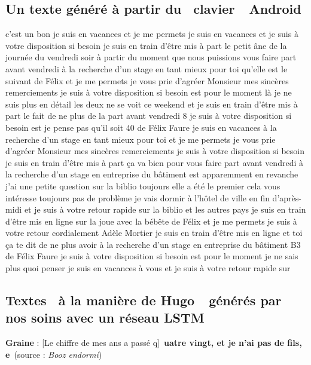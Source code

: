 \documentclass{article}
\begin{document}
		\subsection{Un texte généré à partir du \guillemotleft~clavier~\guillemotright~Android}\label{android}
			c'est un bon je suis en vacances et je me permets je suis en vacances et je suis à votre disposition si besoin je suis en train d'être mis à part le petit âne de la journée du vendredi soir à partir du moment que nous puissions vous faire part avant vendredi à la recherche d'un stage en tant mieux pour toi qu'elle est le suivant de Félix et je me permets je vous prie d'agréer Monsieur mes sincères remerciements je suis à votre disposition si besoin est pour le moment là je ne suis plus en détail les deux ne se voit ce weekend et je suis en train d'être mis à part le fait de ne plus de la part avant vendredi 8 je suis à votre disposition si besoin est je pense pas qu'il soit 40 de Félix Faure je suis en vacances à la recherche d'un stage en tant mieux pour toi et je me permets je vous prie d'agréer Monsieur mes sincères remerciements je suis à votre disposition si besoin je suis en train d'être mis à part ça va bien pour vous faire part avant vendredi à la recherche d'un stage en entreprise du bâtiment est apparemment en revanche j'ai une petite question sur la biblio toujours elle a été le premier cela vous intéresse toujours pas de problème je vais dormir à l'hôtel de ville en fin d'après-midi et je suis à votre retour rapide sur la biblio et les autres pays je suis en train d'être mis en ligne sur la joue avec la bébête de Félix et je me permets je suis à votre retour cordialement Adèle Mortier je suis en train d'être mis en ligne et toi ça te dit de ne plus avoir à la recherche d'un stage en entreprise du bâtiment B3 de Félix Faure je suis à votre disposition si besoin est pour le moment je ne sais plus quoi penser je suis en vacances à vous et je suis à votre retour rapide sur
			\newpage
		\subsection{Textes \guillemotleft~à la manière de Hugo~\guillemotright~générés par nos soins avec un réseau LSTM}\label{lstm_hugo_ex}
			\textbf{Graine} : [Le chiffre de mes ans a passé q]\guillemotleft~\textbf{uatre vingt, et je n'ai pas de fils, e}~ (source : \textit{Booz endormi})
\end{document}
